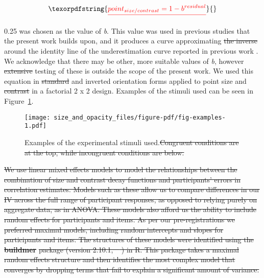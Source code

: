 \documentclass[manuscript, review, anonymous, screen]{acmart}
\providecommand{\DIFaddtex}[1]{{\protect\color{blue}\uwave{#1}}} %
\providecommand{\DIFdeltex}[1]{{\protect\color{red}\sout{#1}}}                      %
\providecommand{\DIFaddbegin}{} %
\providecommand{\DIFaddend}{} %
\providecommand{\DIFdelbegin}{} %
\providecommand{\DIFdelend}{} %
\providecommand{\DIFdelFL}[1]{\DIFdel{#1}} %
\providecommand{\DIFaddbeginFL}{} %
\providecommand{\DIFaddendFL}{} %
\providecommand{\DIFdelbeginFL}{} %
\providecommand{\DIFdelendFL}{} %
\providecommand{\DIFadd}[1]{\texorpdfstring{\DIFaddtex{#1}}{#1}} %
\providecommand{\DIFdel}[1]{\texorpdfstring{\DIFdeltex{#1}}{}} %
\newcommand{\DIFscaledelfig}{0.5}
\newlength{\DIFdelgraphicswidth} %
\newlength{\DIFdelgraphicsheight} %
\newcommand{\DIFaddincludegraphics}[2][]{{\color{blue}\fbox{\DIFOincludegraphics[#1]{#2}}}} %
\newcommand{\DIFdelincludegraphics}[2][]{%
\sbox{\DIFdelgraphicsbox}{\DIFOincludegraphics[#1]{#2}}%
\settoboxwidth{\DIFdelgraphicswidth}{\DIFdelgraphicsbox} %
\settoboxtotalheight{\DIFdelgraphicsheight}{\DIFdelgraphicsbox} %
\scalebox{\DIFscaledelfig}{%
\parbox[b]{\DIFdelgraphicswidth}{\usebox{\DIFdelgraphicsbox}\\[-\baselineskip] \rule{\DIFdelgraphicswidth}{0em}}\llap{\resizebox{\DIFdelgraphicswidth}{\DIFdelgraphicsheight}{%
\setlength{\unitlength}{\DIFdelgraphicswidth}%
\begin{picture}(1,1)%
\thicklines\linethickness{2pt} %
{\color[rgb]{1,0,0}\put(0,0){\framebox(1,1){}}}%
{\color[rgb]{1,0,0}\put(0,0){\line( 1,1){1}}}%
{\color[rgb]{1,0,0}\put(0,1){\line(1,-1){1}}}%
\end{picture}%
}\hspace*{3pt}}} %
} %
\DeclareRobustCommand{\DIFaddbegin}{\DIFOaddbegin \let\includegraphics\DIFaddincludegraphics} %
\DeclareRobustCommand{\DIFaddend}{\DIFOaddend \let\includegraphics\DIFOincludegraphics} %
\DeclareRobustCommand{\DIFdelbegin}{\DIFOdelbegin \let\includegraphics\DIFdelincludegraphics} %
\DeclareRobustCommand{\DIFdelend}{\DIFOaddend \let\includegraphics\DIFOincludegraphics} %
\DeclareRobustCommand{\DIFaddbeginFL}{\DIFOaddbeginFL \let\includegraphics\DIFaddincludegraphics} %
\DeclareRobustCommand{\DIFaddendFL}{\DIFOaddendFL \let\includegraphics\DIFOincludegraphics} %
\DeclareRobustCommand{\DIFdelbeginFL}{\DIFOdelbeginFL \let\includegraphics\DIFdelincludegraphics} %
\DeclareRobustCommand{\DIFdelendFL}{\DIFOaddendFL \let\includegraphics\DIFOincludegraphics} %
\begin{document}
\begin{displaymath}
  \DIFdel{point_{size/contrast} = 1 - b^{residual}
}\end{displaymath}%

\DIFdelend 0.25 was chosen as the
value of \emph{b}. This value was used in previous studies that the
present work builds upon, and it produces a curve approximating \DIFdelbegin \DIFdel{the inverse }\DIFdelend \DIFaddbegin \DIFadd{a
reflection }\DIFaddend around the identity line of the underestimation curve
reported in previous work
\citep{rensink_2017, strain_2023, strain_2023b}. We acknowledge that
there may be other, more suitable values of \emph{b}, however \DIFdelbegin \DIFdel{extensive
}\DIFdelend testing of
these is outside the scope of the present work. We used this equation in
\DIFdelbegin \DIFdel{standard }\DIFdelend \DIFaddbegin \DIFadd{typical }\DIFaddend and inverted orientation forms applied to point size and \DIFdelbegin \DIFdel{contrast }\DIFdelend \DIFaddbegin \DIFadd{opacity
}\DIFaddend in a factorial 2 x 2 design. Examples of the stimuli used can be seen in
Figure~\ref{fig-examples}.

\begin{figure}

\DIFdelbeginFL %
\DIFdelendFL \DIFaddbeginFL \texttt{[image: size\_and\_opacity\_files/figure-pdf/fig-examples-1.pdf]} \DIFaddendFL \hfill{}

\caption{\label{fig-examples}Examples of the experimental stimuli used.\DIFdelbeginFL \DIFdelFL{Congruent conditions are at the top, while incongruent conditions are
below.}\DIFdelendFL }

\end{figure}

\DIFdelbegin %

\DIFdel{We use linear mixed effects models to model the relationships between
the combination of size and contrast decay functions and participants'
errors in correlation estimates. Models such as these allow us to
compare differences in our IV across the full range of participant
responses, as opposed to relying purely on aggregate data, as in ANOVA.
These models also afford us the ability to include random effects for
participants and items. As per our pre-registrations we preferred
maximal models, including random intercepts and slopes for participants
and items. The structures of these models were identified using the
}\textbf{\DIFdel{buildmer}} %
\DIFdel{package (version 2.10.1, \mbox{%
\citep{voeten_buildmer}}\hskip0pt%
) in
R. This package takes a maximal random effects structure and then
identifies the most complex model that converges by dropping terms that
fail to explain a significant amount of variance.
}%
\end{document}
